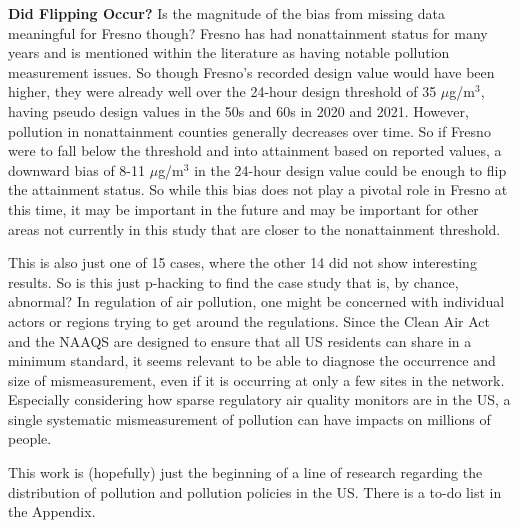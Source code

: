 \documentclass[12pt]{article}
\begin{document}
\noindent\textbf{Did Flipping Occur?}
Is the magnitude of the bias from missing data meaningful for Fresno though? Fresno has had nonattainment status for many years and is mentioned within the literature as having notable pollution measurement issues. So though Fresno's recorded design value would have been higher, they were already well over the 24-hour design threshold of 35 $\mu$g/m$^3$, having pseudo design values in the 50s and 60s in 2020 and 2021. However, pollution in nonattainment counties generally decreases over time. So if Fresno were to fall below the threshold and into attainment based on reported values, a downward bias of 8-11 $\mu$g/m$^3$ in the 24-hour design value could be enough to flip the attainment status. So while this bias does not play a pivotal role in Fresno at this time, it may be important in the future and may be important for other areas not currently in this study that are closer to the nonattainment threshold.

This is also just one of 15 cases, where the other 14 did not show interesting results. So is this just p-hacking to find the case study that is, by chance, abnormal? In regulation of air pollution, one might be concerned with individual actors or regions trying to get around the regulations. Since the Clean Air Act and the NAAQS are designed to ensure that all US residents can share in a minimum standard, it seems relevant to be able to diagnose the occurrence and size of mismeasurement, even if it is occurring at only a few sites in the network. Especially considering how sparse regulatory air quality monitors are in the US, a single systematic mismeasurement of pollution can have impacts on millions of people.

This work is (hopefully) just the beginning of a line of research regarding the distribution of pollution and pollution policies in the US. There is a to-do list in the Appendix.











\newpage


% 
%
\end{document}
